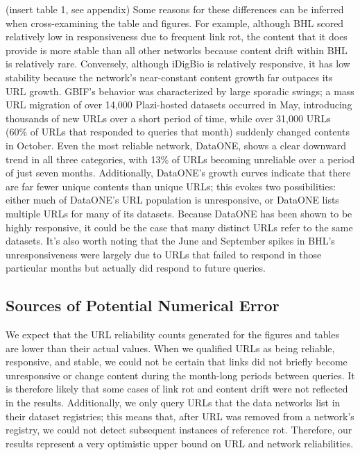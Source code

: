 % 
(insert table 1, see appendix)
Some reasons for these differences can be inferred when cross-examining the table and figures. For example, although BHL scored relatively low in responsiveness due to frequent link rot, the content that it does provide is more stable than all other networks because content drift within BHL is relatively rare. Conversely, although iDigBio is relatively responsive, it has low stability because the network’s near-constant content growth far outpaces its URL growth. GBIF’s behavior was characterized by large sporadic swings; a mass URL migration of over 14,000 Plazi-hosted datasets occurred in May, introducing thousands of new URLs over a short period of time, while over 31,000 URLs (60\% of URLs that responded to queries that month) suddenly changed contents in October. Even the most reliable network, DataONE, shows a clear downward trend in all three categories, with 13\% of URLs becoming unreliable over a period of just seven months. Additionally, DataONE’s growth curves indicate that there are far fewer unique contents than unique URLs; this evokes two possibilities: either much of DataONE’s URL population is unresponsive, or DataONE lists multiple URLs for many of its datasets. Because DataONE has been shown to be highly responsive, it could be the case that many distinct URLs refer to the same datasets. It’s also worth noting that the June and September spikes in BHL’s unresponsiveness were largely due to URLs that failed to respond in those particular months but actually did respond to future queries.

\subsection*{Sources of Potential Numerical Error}
We expect that the URL reliability counts generated for the figures and tables are lower than their actual values. When we qualified URLs as being reliable, responsive, and stable, we could not be certain that links did not briefly become unresponsive or change content during the month-long periods between queries. It is therefore likely that some cases of link rot and content drift were not reflected in the results. Additionally, we only query URLs that the data networks list in their dataset registries; this means that, after URL was removed from a network’s registry, we could not detect subsequent instances of reference rot. Therefore, our results represent a very optimistic upper bound on URL and network reliabilities.

